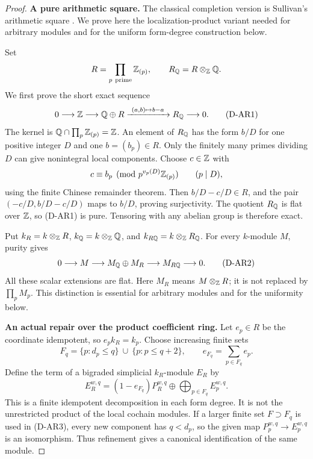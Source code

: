 \begin{proof}
\par\medskip\noindent\textbf{A pure arithmetic square.}
The classical completion version is Sullivan's arithmetic square
\cite[Chapter~1, Propositions~1.17--1.18, pp.~28--30]{A_sullivan_mit2005}.
We prove here the localization-product variant needed for arbitrary
modules and for the uniform form-degree construction below.

Set
\[
 R=\prod_{p\ \mathrm{prime}}\mathbb Z_{(p)},
 \qquad R_\mathbb Q=R\otimes_\mathbb Z\mathbb Q.
\]
We first prove the short exact sequence
\begin{equation}
 0\longrightarrow\mathbb Z\longrightarrow\mathbb Q\oplus R
   \xrightarrow{\ (a,b)\mapsto b-a\ }R_\mathbb Q
   \longrightarrow0.
 \tag{D-AR1}
\end{equation}
The kernel is $\mathbb Q\cap\prod_p\mathbb Z_{(p)}=\mathbb Z$.
An element of $R_\mathbb Q$ has the form $b/D$ for one positive
integer $D$ and one $b=(b_p)\in R$. Only the finitely many
primes dividing $D$ can give nonintegral local components.
Choose $c\in\mathbb Z$ with
\[
 c\equiv b_p\pmod{p^{v_p(D)}\mathbb Z_{(p)}}
 \qquad(p\mid D),
\]
using the finite Chinese remainder theorem. Then
$b/D-c/D\in R$, and the pair
$(-c/D,b/D-c/D)$ maps to $b/D$, proving surjectivity. The quotient
$R_\mathbb Q$ is flat over $\mathbb Z$, so (D-AR1) is pure. Tensoring
with any abelian group is therefore exact.

Put $k_R=k\otimes_\mathbb Z R$, $k_\mathbb Q=k\otimes_\mathbb Z\mathbb Q$, and
$k_{R\mathbb Q}=k\otimes_\mathbb Z R_\mathbb Q$. For every $k$-module $M$,
purity gives
\begin{equation}
 0\longrightarrow M\longrightarrow M_\mathbb Q\oplus M_R
       \longrightarrow M_{R\mathbb Q}\longrightarrow0.
 \tag{D-AR2}
\end{equation}
All these scalar extensions are flat. Here $M_R$ means
$M\otimes_\mathbb Z R$; it is not replaced by
$\prod_p M_p$. This distinction is essential for arbitrary
modules and for the uniformity below.

\par\medskip\noindent\textbf{An actual repair over the product coefficient ring.}
Let $e_p\in R$ be the coordinate idempotent, so
$e_pk_R=k_p$. Choose increasing finite sets
\[
 F_q=\{p:d_p\leq q\}\ \cup\ \{p:p\leq q+2\},
 \qquad e_{F_q}=\sum_{p\in F_q}e_p.
\]
Define the term of a bigraded simplicial $k_R$-module $E_R$
by
\begin{equation}
 E_R^{w,q}
  =(1-e_{F_q})P_R^{w,q}
       \oplus\bigoplus_{p\in F_q}E_p^{w,q}.
 \tag{D-AR3}
\end{equation}
This is a finite idempotent decomposition in each form degree.
It is not the unrestricted product of the local cochain
modules. If a larger finite set $F\supset F_q$ is used in
(D-AR3), every new component has $q<d_p$, so the given map
$P_p^{w,q}\to E_p^{w,q}$ is an isomorphism. Thus refinement
gives a canonical identification of the same module.


\end{proof}
